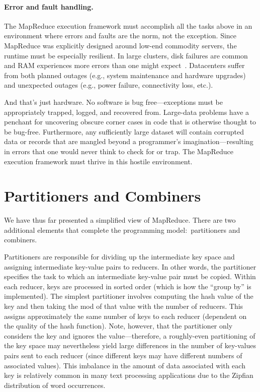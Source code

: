 \paragraph{Error and fault handling.}  The MapReduce execution
framework must accomplish all the tasks above in an environment where
errors and faults are the norm, not the exception.  Since MapReduce
was explicitly designed around low-end commodity servers, the runtime
must be especially resilient.  In large clusters, disk failures are
common~\cite{Pinheiro_etal_2007} and RAM experiences more errors than
one might expect~\cite{Schroeder_etal_2009}.  Datacenters suffer from
both planned outages (e.g., system maintenance and hardware upgrades)
and unexpected outages (e.g., power failure, connectivity loss, etc.).

And that's just hardware.  No software is bug free---exceptions must
be appropriately trapped, logged, and recovered from.  Large-data
problems have a penchant for uncovering obscure corner cases in code
that is otherwise thought to be bug-free.  Furthermore, any
sufficiently large dataset will contain corrupted data or records that
are mangled beyond a programmer's imagination---resulting in errors
that one would never think to check for or trap.  The MapReduce
execution framework must thrive in this hostile environment.

\section{Partitioners and Combiners}
\label{chapter2:partitioners-and-combiners}

We have thus far presented a simplified view of MapReduce.  There are
two additional elements that complete the programming model:\
partitioners and combiners.

Partitioners are responsible for dividing up the intermediate key
space and assigning intermediate key-value pairs to reducers.  In
other words, the partitioner specifies the task to which an
intermediate key-value pair must be copied.  Within each reducer, keys
are processed in sorted order (which is how the ``group by'' is
implemented).  The simplest partitioner involves computing the hash
value of the key and then taking the mod of that value with the number
of reducers.  This assigns approximately the same number of keys to
each reducer (dependent on the quality of the hash function).  Note,
however, that the partitioner only considers the key and ignores the
value---therefore, a roughly-even partitioning of the key space may
nevertheless yield large differences in the number of key-values pairs
sent to each reducer (since different keys may have different numbers
of associated values).  This imbalance in the amount of data
associated with each key is relatively common in many text processing
applications due to the Zipfian distribution of word occurrences.

